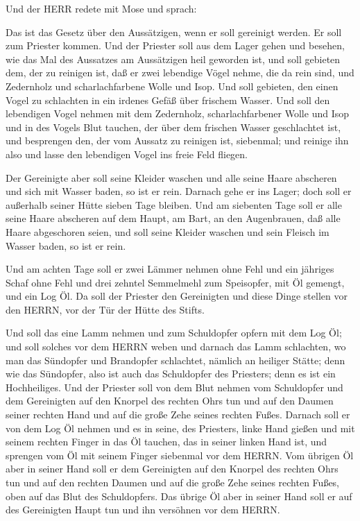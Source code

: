  Und der HERR redete mit Mose und sprach:

 Das ist das Gesetz über den Aussätzigen, wenn er soll
gereinigt werden. Er soll zum Priester kommen.  Und der
Priester soll aus dem Lager gehen und besehen, wie das Mal des Aussatzes
am Aussätzigen heil geworden ist,  und soll gebieten dem,
der zu reinigen ist, daß er zwei lebendige Vögel nehme, die da rein
sind, und Zedernholz und scharlachfarbene Wolle und Isop. 
Und soll gebieten, den einen Vogel zu schlachten in ein irdenes Gefäß
über frischem Wasser.  Und soll den lebendigen Vogel nehmen
mit dem Zedernholz, scharlachfarbener Wolle und Isop und in des Vogels
Blut tauchen, der über dem frischen Wasser geschlachtet ist,
 und besprengen den, der vom Aussatz zu reinigen ist,
siebenmal; und reinige ihn also und lasse den lebendigen Vogel ins freie
Feld fliegen.

 Der Gereinigte aber soll seine Kleider waschen und alle
seine Haare abscheren und sich mit Wasser baden, so ist er rein. Darnach
gehe er ins Lager; doch soll er außerhalb seiner Hütte sieben Tage
bleiben.  Und am siebenten Tage soll er alle seine Haare
abscheren auf dem Haupt, am Bart, an den Augenbrauen, daß alle Haare
abgeschoren seien, und soll seine Kleider waschen und sein Fleisch im
Wasser baden, so ist er rein.

 Und am achten Tage soll er zwei Lämmer nehmen ohne Fehl
und ein jähriges Schaf ohne Fehl und drei zehntel Semmelmehl zum
Speisopfer, mit Öl gemengt, und ein Log Öl.  Da soll der
Priester den Gereinigten und diese Dinge stellen vor den HERRN, vor der
Tür der Hütte des Stifts.

 Und soll das eine Lamm nehmen und zum Schuldopfer opfern
mit dem Log Öl; und soll solches vor dem HERRN weben  und
darnach das Lamm schlachten, wo man das Sündopfer und Brandopfer
schlachtet, nämlich an heiliger Stätte; denn wie das Sündopfer, also ist
auch das Schuldopfer des Priesters; denn es ist ein Hochheiliges.
 Und der Priester soll von dem Blut nehmen vom Schuldopfer
und dem Gereinigten auf den Knorpel des rechten Ohrs tun und auf den
Daumen seiner rechten Hand und auf die große Zehe seines rechten Fußes.
 Darnach soll er von dem Log Öl nehmen und es in seine, des
Priesters, linke Hand gießen  und mit seinem rechten Finger
in das Öl tauchen, das in seiner linken Hand ist, und sprengen vom Öl
mit seinem Finger siebenmal vor dem HERRN.  Vom übrigen Öl
aber in seiner Hand soll er dem Gereinigten auf den Knorpel des rechten
Ohrs tun und auf den rechten Daumen und auf die große Zehe seines
rechten Fußes, oben auf das Blut des Schuldopfers.  Das
übrige Öl aber in seiner Hand soll er auf des Gereinigten Haupt tun und
ihn versöhnen vor dem HERRN.

